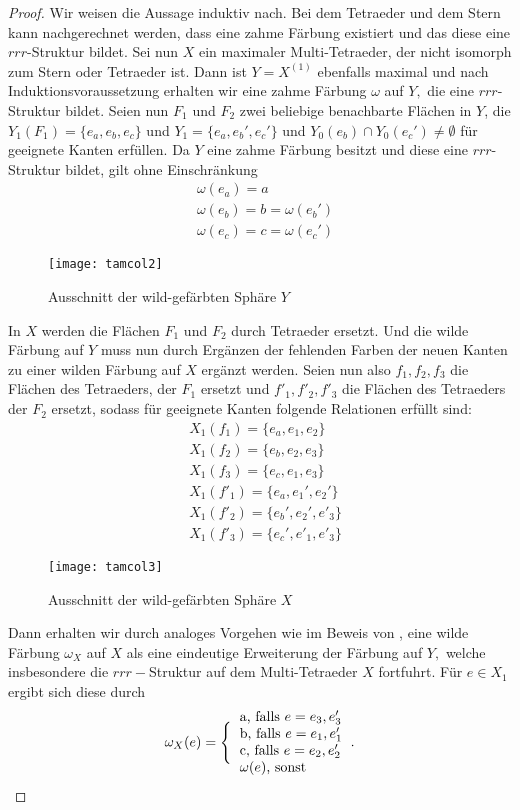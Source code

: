 \documentclass[12pt,titlepage,twoside,cleardoublepage]{article}
\numberwithin{equation}{section}
\begin{document}
\begin{proof}
Wir weisen die Aussage induktiv nach. Bei dem Tetraeder und dem Stern kann nachgerechnet werden, dass eine zahme Färbung existiert und das diese eine $rrr$-Struktur bildet. Sei nun $X$ ein maximaler Multi-Tetraeder, der nicht isomorph zum Stern oder Tetraeder ist.
 Dann ist $Y=X^{(1)}$ ebenfalls maximal und nach Induktionsvoraussetzung erhalten wir eine zahme Färbung $\omega$ auf $Y,$ die eine $rrr$-Struktur bildet. Seien nun $F_1$ und $F_2$ zwei beliebige benachbarte Flächen in $Y$, die $Y_1(F_1)=\{e_a,e_b,e_c\}$ und $Y_1=\{e_a,e_b',e_c'\}$ und $Y_0(e_b)\cap Y_0(e_c')\neq \emptyset$ für geeignete Kanten erfüllen.
Da $Y$ eine zahme Färbung besitzt und diese eine $rrr$-Struktur bildet, gilt ohne Einschränkung
\begin{align*}
&\omega(e_a)=a\\
&\omega(e_b)=b=\omega(e_b')\\
&\omega(e_c)=c=\omega(e_c')
\end{align*}
\begin{figure}[H]
\begin{center}
\texttt{[image: tamcol2]}
\end{center}
\caption{Ausschnitt der wild-gefärbten Sphäre $Y$}
\end{figure}
In $X$ werden die Flächen $F_1$ und $F_2$ durch Tetraeder ersetzt. Und die wilde Färbung auf $Y$ muss nun durch Ergänzen der fehlenden Farben der neuen Kanten zu einer wilden Färbung auf $X$ ergänzt werden. Seien nun also $f_1,f_2,f_3$ die Flächen des Tetraeders, der $F_1$ ersetzt und $f'_1,f'_2,f'_3$ die Flächen des Tetraeders der $F_2$ ersetzt, sodass für geeignete Kanten folgende Relationen erfüllt sind:
\begin{align*}
&X_1(f_1)=\{e_a,e_1,e_2\}\\
&X_1(f_2)=\{e_b,e_2,e_3\}\\
&X_1(f_3)=\{e_c,e_1,e_3\}\\
&X_1(f'_1)=\{e_a,e_1',e_2'\}\\
&X_1(f'_2)=\{e_b',e_2',e'_3\}\\
&X_1(f'_3)=\{e_c',e'_1,e'_3\}
\end{align*}
\begin{figure}[H]
\begin{center}
\texttt{[image: tamcol3]}
\end{center}
\caption{Ausschnitt der wild-gefärbten Sphäre $X$}
\end{figure}
Dann erhalten wir durch analoges Vorgehen wie im Beweis von , eine wilde Färbung $\omega_X$ auf $X$ als eine eindeutige Erweiterung der Färbung auf $Y,$ welche insbesondere die $rrr-$Struktur auf dem Multi-Tetraeder $X$ fortfuhrt. Für $e\in X_1$ ergibt sich diese durch 
\begin{align*}
\omega_X(e)=\Biggl\{\begin{tabular}[l]{lcr}
a, falls $e=e_3,e_3'$\\
b, falls $e=e_1,e_1'$\\
c, falls $e=e_2,e_2'$\\
$\omega(e)$, sonst
\end{tabular}.
\end{align*}


\end{proof}
\end{document}
